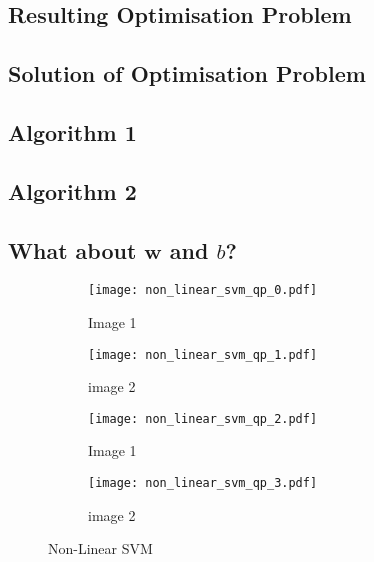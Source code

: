 \documentclass[10pt, a4paper,reqno]{amsart}
\begin{document}
\subsection{Resulting Optimisation Problem}


\subsection{Solution of Optimisation Problem}


\subsection{Algorithm 1}


\subsection{Algorithm 2}


\subsection{What about $\mathbf{w}$ and $b$?}


\begin{figure}[H]
	\centering	
	\begin{subfigure}{0.5\textwidth}
		\centering
		\texttt{[image: non\_linear\_svm\_qp\_0.pdf]}
		\caption{Image 1}
	\end{subfigure}%
	\begin{subfigure}{0.5\textwidth}
		\centering
		\texttt{[image: non\_linear\_svm\_qp\_1.pdf]}
		\caption{image 2}
	\end{subfigure}
	\begin{subfigure}{0.5\textwidth}
		\centering
		\texttt{[image: non\_linear\_svm\_qp\_2.pdf]}
		\caption{Image 1}
	\end{subfigure}%
	\begin{subfigure}{0.5\textwidth}
		\centering
		\texttt{[image: non\_linear\_svm\_qp\_3.pdf]}
		\caption{image 2}
	\end{subfigure}
	\caption{Non-Linear SVM}
\end{figure}
\end{document}
